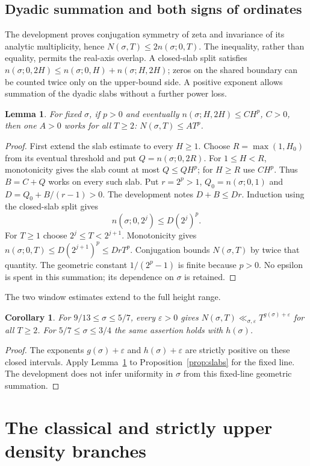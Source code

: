 \documentclass[11pt,a4paper,oneside]{article}
\newtheorem{lemma}[theorem]{Lemma}
\newtheorem{corollary}[theorem]{Corollary}
\theoremstyle{definition}
\newcommand{\eps}{\varepsilon}
\numberwithin{equation}{section}
\begin{document}
\subsection{Dyadic summation and both signs of ordinates}
The development proves conjugation symmetry of zeta and invariance of its analytic
multiplicity, hence
$N(\sigma,T)\le2n(\sigma;0,T)$.
The inequality, rather than equality, permits the real-axis overlap.
A closed-slab split satisfies
$n(\sigma;0,2H)\le n(\sigma;0,H)+n(\sigma;H,2H)$;
zeros on the shared boundary can be counted twice only on the upper-bound side.
A positive exponent allows summation of the dyadic slabs without a further power loss.
\begin{lemma}\label{lem:dyadic}
For fixed $\sigma$, if $p>0$ and eventually
$n(\sigma;H,2H)\le CH^p$, $C>0$, then one $A>0$ works for all $T\ge2$:
$N(\sigma,T)\le AT^p$.
\end{lemma}
\begin{proof}
First extend the slab estimate to every $H\ge1$.
Choose $R=\max(1,H_0)$ from its eventual threshold and put
$Q=n(\sigma;0,2R)$. For $1\le H<R$, monotonicity gives the slab count
at most $Q\le QH^p$; for $H\ge R$ use $CH^p$.
Thus $B=C+Q$ works on every such slab.
Put $r=2^p>1$, $Q_0=n(\sigma;0,1)$ and
$D=Q_0+B/(r-1)>0$. The development notes $D+B\le Dr$.
Induction using the closed-slab split gives
\[
 n(\sigma;0,2^j)\le D(2^j)^p.
\]
For $T\ge1$ choose $2^j\le T<2^{j+1}$. Monotonicity gives
$n(\sigma;0,T)\le D(2^{j+1})^p\le DrT^p$.
Conjugation bounds $N(\sigma,T)$ by twice that quantity. The geometric
constant $1/(2^p-1)$ is finite because $p>0$. No epsilon is spent in
this summation; its dependence on $\sigma$ is retained.
\end{proof}
The two window estimates extend to the full height range.
\begin{corollary}\label{cor:windows}
For $9/13\le\sigma\le5/7$, every $\eps>0$ gives
$N(\sigma,T)\ll_{\sigma,\eps}T^{g(\sigma)+\eps}$ for all $T\ge2$.
For $5/7\le\sigma\le3/4$ the same assertion holds with $h(\sigma)$.
\end{corollary}
\begin{proof}
The exponents $g(\sigma)+\eps$ and $h(\sigma)+\eps$ are strictly
positive on these closed intervals. Apply Lemma~\ref{lem:dyadic} to
Proposition~\ref{prop:slabs} for the fixed line. The development does not infer
uniformity in $\sigma$ from this fixed-line geometric summation.
\end{proof}
\section{The classical and strictly upper density branches}\label{ch:otherbranches}
\end{document}
